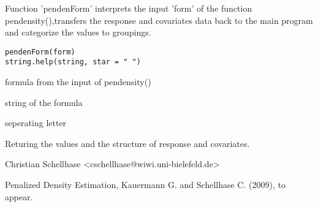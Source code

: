 \begin{Description}\relax
Function 'pendenForm' interprets the input 'form' of the function pendensity(),transfers the response and covariates data back to the main program and categorize the values to groupings.
\end{Description}
\begin{Usage}
\begin{verbatim}
pendenForm(form)
string.help(string, star = " ")
\end{verbatim}
\end{Usage}
\begin{Arguments}
\begin{ldescription}
\item[\code{form}] formula from the input of pendensity()
\item[\code{string}] string of the formula
\item[\code{star}] seperating letter
\end{ldescription}
\end{Arguments}
\begin{Value}
Returing the values and the structure of response and covariates.
\end{Value}
\begin{Author}\relax
Christian Schellhase <cschellhase@wiwi.uni-bielefeld.de>
\end{Author}
\begin{References}\relax
Penalized Density Estimation, Kauermann G. and Schellhase C. (2009), to appear.
\end{References}

